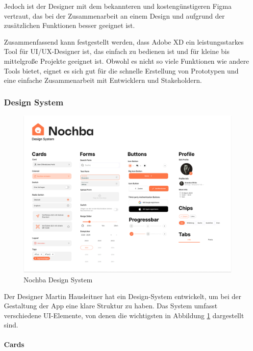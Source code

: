 Jedoch ist der Designer mit
dem bekannteren und kostengünstigeren Figma vertraut, das
bei der Zusammenarbeit an einem Design und aufgrund der
zusätzlichen Funktionen besser geeignet ist.

Zusammenfassend kann festgestellt werden, dass Adobe XD ein leistungsstarkes Tool für UI/UX-Designer ist, das einfach zu bedienen ist und für kleine bis mittelgroße Projekte geeignet ist. Obwohl es nicht so viele Funktionen wie andere Tools bietet, eignet es sich gut für die schnelle Erstellung von Prototypen und eine einfache Zusammenarbeit mit Entwicklern und Stakeholdern.

\subsubsection{Design System}
\begin{figure}[H]
  \centering
  \includegraphics[width=1\textwidth]{pics/design-system.png}
  \caption{Nochba Design System}
  \label{fig:design-system}
\end{figure}

Der Designer Martin Hausleitner hat ein Design-System
entwickelt, um bei der Gestaltung der App eine klare
Struktur zu haben. Das System umfasst verschiedene
UI-Elemente, von denen die wichtigsten in Abbildung
\ref{fig:design-system} dargestellt sind.

\paragraph{Cards}\mbox{} \\

